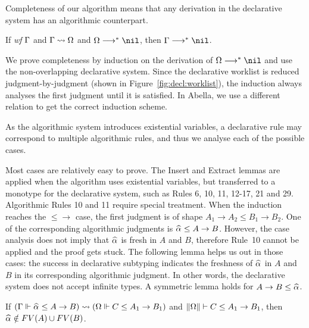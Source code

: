 Completeness of our algorithm means that any derivation in the
declarative system has an algorithmic counterpart.

\begin{theorem}[Completeness]
If \emph{wf }$\Gamma$ and $\Gamma\rightsquigarrow\Omega$ and $\Om\redto\nil$, then $\Gm \redto \nil$.
\label{thm:completeness}
\end{theorem}

We prove completeness by induction on the derivation of $\Om\redto\nil$
and use the non-overlapping declarative system.
Since the declarative worklist is reduced judgment-by-judgment
(shown in Figure~\ref{fig:decl:worklist}),
the induction always analyses the first judgment until it is satisfied.
In Abella, we use a different relation to get the correct induction scheme.

As the algorithmic system introduces existential variables,
a declarative rule may correspond to multiple algorithmic rules,
and thus we analyse each of the possible cases.

Most cases are relatively easy to prove.
The Insert and Extract lemmas are applied when the algorithm uses existential variables,
but transferred to a monotype for the declarative system,
such as Rules 6, 10, 11, 12-17, 21 and 29.
Algorithmic Rules 10 and 11 require special treatment.
When the induction reaches the $\mathtt{{\le}{\to}}$ case,
the first judgment is of shape $A_1 \to A_2 \le B_1 \to B_2$.
One of the corresponding algorithmic judgments is $\al \le A \to B$.
However, the case analysis does not imply that $\al$ is fresh in $A$ and $B$,
therefore Rule~10 cannot be applied and the proof gets stuck.
The following lemma helps us out in those cases:
the success in declarative subtyping indicates the freshness of $\al$ in $A$ and $B$
in its corresponding algorithmic judgment.
In other words, the declarative system does not accept infinite types.
A symmetric lemma holds for $A\to B \le \al$.

\begin{lemma}
If $(\Gm \Vdash \al \le A \to B) \sto (\Om \Vdash C \le A_1 \to B_1)$ and
$\|\Omega\| \vdash C \le A_1 \to B_1$, then $\al\notin FV(A) \cup FV(B)$.
\end{lemma}

